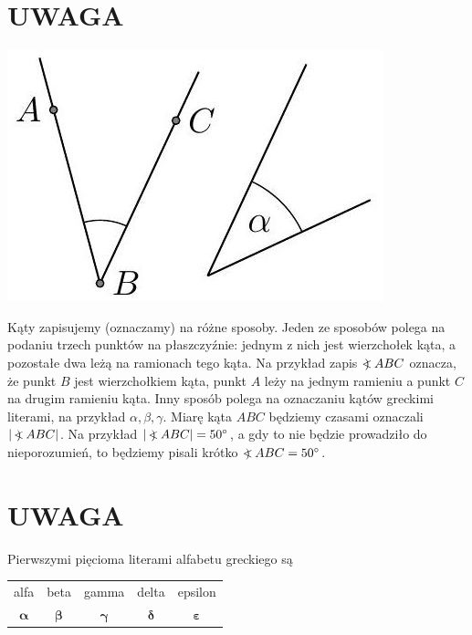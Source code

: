 \documentclass[10pt]{article}
\newcommand\Varangle{\mathop{{<\!\!\!\!\!\text{\small)}}\:}\nolimits}
\begin{document}
\section*{UWAGA}
\begin{center}
\includegraphics[max width=\textwidth]{2024_11_21_8f01584889ff06348ae7g-187}
\end{center}

Kąty zapisujemy (oznaczamy) na różne sposoby. Jeden ze sposobów polega na podaniu trzech punktów na płaszczyźnie: jednym z nich jest wierzchołek kąta, a pozostałe dwa leżą na ramionach tego kąta. Na przykład zapis \(\Varangle A B C\) oznacza, że punkt \(B\) jest wierzchołkiem kąta, punkt \(A\) leży na jednym ramieniu a punkt \(C\) na drugim ramieniu kąta. Inny sposób polega na oznaczaniu kątów greckimi literami, na przykład \(\alpha, \beta, \gamma\). Miarę kąta \(A B C\) będziemy czasami oznaczali \(|\Varangle A B C|\). Na przykład \(|\Varangle A B C|=50^{\circ}\), a gdy to nie będzie prowadziło do nieporozumień, to będziemy pisali krótko \(\Varangle A B C=50^{\circ}\).

\section*{UWAGA}
Pierwszymi pięcioma literami alfabetu greckiego są

\begin{center}
\begin{tabular}{ccccc}
alfa & beta & gamma & delta & epsilon \\
\(\boldsymbol{\alpha}\) & \(\boldsymbol{\beta}\) & \(\boldsymbol{\gamma}\) & \(\boldsymbol{\delta}\) & \(\boldsymbol{\varepsilon}\) \\
\end{tabular}
\end{center}
\end{document}
